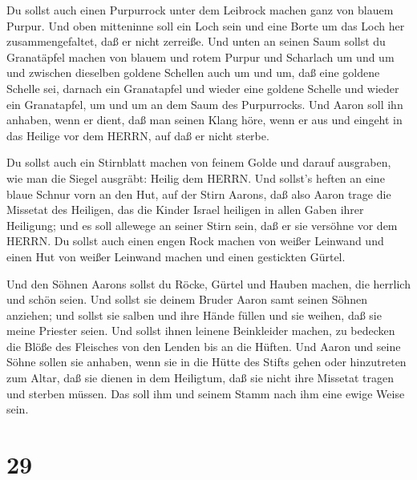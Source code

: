  Du sollst auch einen Purpurrock unter dem Leibrock machen
ganz von blauem Purpur.  Und oben mitteninne soll ein Loch
sein und eine Borte um das Loch her zusammengefaltet, daß er nicht
zerreiße.  Und unten an seinen Saum sollst du Granatäpfel
machen von blauem und rotem Purpur und Scharlach um und um und zwischen
dieselben goldene Schellen auch um und um,  daß eine
goldene Schelle sei, darnach ein Granatapfel und wieder eine goldene
Schelle und wieder ein Granatapfel, um und um an dem Saum des
Purpurrocks.  Und Aaron soll ihn anhaben, wenn er dient,
daß man seinen Klang höre, wenn er aus und eingeht in das Heilige vor
dem HERRN, auf daß er nicht sterbe.

 Du sollst auch ein Stirnblatt machen von feinem Golde und
darauf ausgraben, wie man die Siegel ausgräbt: Heilig dem HERRN.
 Und sollst's heften an eine blaue Schnur vorn an den Hut,
 auf der Stirn Aarons, daß also Aaron trage die Missetat
des Heiligen, das die Kinder Israel heiligen in allen Gaben ihrer
Heiligung; und es soll allewege an seiner Stirn sein, daß er sie
versöhne vor dem HERRN.  Du sollst auch einen engen Rock
machen von weißer Leinwand und einen Hut von weißer Leinwand machen und
einen gestickten Gürtel.

 Und den Söhnen Aarons sollst du Röcke, Gürtel und Hauben
machen, die herrlich und schön seien.  Und sollst sie
deinem Bruder Aaron samt seinen Söhnen anziehen; und sollst sie salben
und ihre Hände füllen und sie weihen, daß sie meine Priester seien.
 Und sollst ihnen leinene Beinkleider machen, zu bedecken
die Blöße des Fleisches von den Lenden bis an die Hüften. 
Und Aaron und seine Söhne sollen sie anhaben, wenn sie in die Hütte des
Stifts gehen oder hinzutreten zum Altar, daß sie dienen in dem
Heiligtum, daß sie nicht ihre Missetat tragen und sterben müssen. Das
soll ihm und seinem Stamm nach ihm eine ewige Weise sein.

\hypertarget{section-28}{%
\section{29}\label{section-28}}

